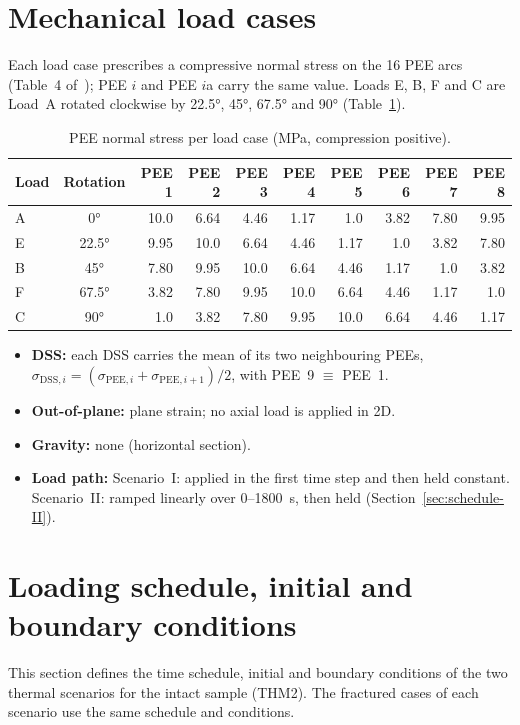 \documentclass[11pt,a4paper]{article}
\begin{document}
\section{Mechanical load cases}
Each load case prescribes a compressive normal stress on the 16 PEE arcs
(Table~4 of~\cite{Mollaali2026}); PEE $i$ and PEE $i$a carry the same value.
Loads E, B, F and C are Load~A rotated clockwise by \ang{22.5}, \ang{45},
\ang{67.5} and \ang{90} (Table~\ref{tab:loads}).

\begin{table}[htbp]
\centering
\caption{PEE normal stress per load case (MPa, compression positive).}
\label{tab:loads}
\begin{tabular}{@{}lc*{8}{r}@{}}
\toprule
Load & Rotation & PEE 1 & PEE 2 & PEE 3 & PEE 4 & PEE 5 & PEE 6 & PEE 7 & PEE 8 \\
\midrule
A & \ang{0}    & 10.0 & 6.64 & 4.46 & 1.17 & 1.0  & 3.82 & 7.80 & 9.95 \\
E & \ang{22.5} & 9.95 & 10.0 & 6.64 & 4.46 & 1.17 & 1.0  & 3.82 & 7.80 \\
B & \ang{45}   & 7.80 & 9.95 & 10.0 & 6.64 & 4.46 & 1.17 & 1.0  & 3.82 \\
F & \ang{67.5} & 3.82 & 7.80 & 9.95 & 10.0 & 6.64 & 4.46 & 1.17 & 1.0  \\
C & \ang{90}   & 1.0  & 3.82 & 7.80 & 9.95 & 10.0 & 6.64 & 4.46 & 1.17 \\
\bottomrule
\end{tabular}
\end{table}

\begin{itemize}
  \item \textbf{DSS:} each DSS carries the mean of its two neighbouring PEEs,
        $\sigma_{\mathrm{DSS},i}=(\sigma_{\mathrm{PEE},i}+\sigma_{\mathrm{PEE},i+1})/2$,
        with PEE~9 $\equiv$ PEE~1.
  \item \textbf{Out-of-plane:} plane strain; no axial load is applied in 2D.
  \item \textbf{Gravity:} none (horizontal section).
  \item \textbf{Load path:} Scenario~I: applied in the first time step and then
        held constant. Scenario~II: ramped linearly over 0--\SI{1800}{s}, then
        held (Section~\ref{sec:schedule-II}).
\end{itemize}

\section{Loading schedule, initial and boundary conditions}
\label{sec:schedule}
This section defines the time schedule, initial and boundary conditions of the
two thermal scenarios for the intact sample (THM2). The fractured cases of each
scenario use the same schedule and conditions.
\end{document}
